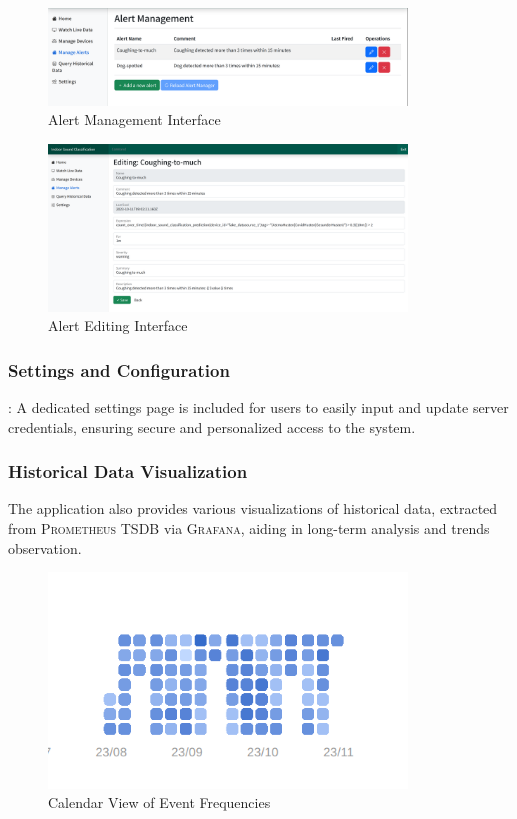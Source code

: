 \begin{figure}[htbp]
  \centering
  \includegraphics[width=0.85\textwidth]{Pictures/alertmanagement}
  \caption{\label{fig:alertmanagement}Alert Management Interface}
\end{figure}

\begin{figure}[htbp]
  \centering
  \includegraphics[width=0.85\textwidth]{Pictures/alertedit}
  \caption{\label{fig:alertedit}Alert Editing Interface}
\end{figure}

\subsubsection{Settings and Configuration}: A dedicated settings page is included for users to easily input and update server credentials, ensuring secure and personalized access to the system.

\subsubsection{Historical Data Visualization}
The application also provides various visualizations of historical data, extracted from \textsc{Prometheus} TSDB via \textsc{Grafana}, aiding in long-term analysis and trends observation.

\begin{figure}[htbp]
  \centering
  \includegraphics[width=0.85\textwidth]{Pictures/calendar-weekday-day}
  \caption{\label{fig:calendar-weekday-day}Calendar View of Event Frequencies}
\end{figure}
